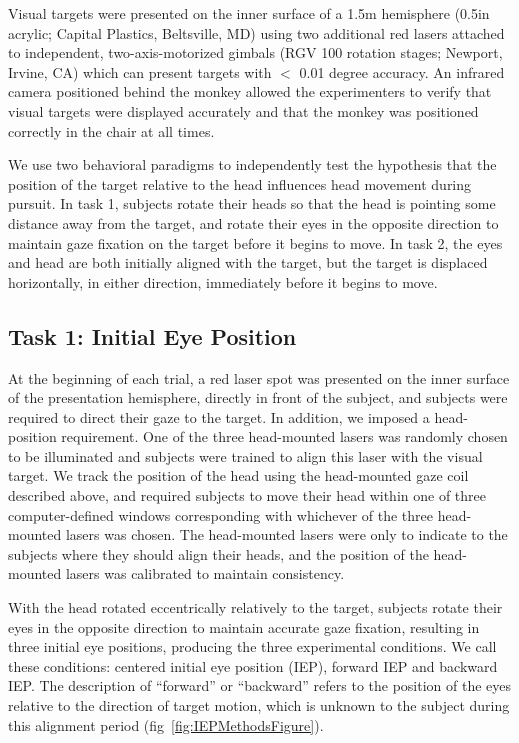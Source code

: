 \documentclass[12pt]{article}
\begin{document}
Visual targets were presented on the inner surface of a 1.5m hemisphere (0.5in acrylic; Capital Plastics, Beltsville, MD) using two additional red lasers attached to independent, two-axis-motorized gimbals (RGV 100 rotation stages; Newport, Irvine, CA) which can present targets with $<$ 0.01 degree accuracy. An infrared camera positioned behind the monkey allowed the experimenters to verify that visual targets were displayed accurately and that the monkey was positioned correctly in the chair at all times. 

We use two behavioral paradigms to independently test the hypothesis that the position of the target relative to the head influences head movement during pursuit. In task 1, subjects rotate their heads so that the head is pointing some distance away from the target, and rotate their eyes in the opposite direction to maintain gaze fixation on the target before it begins to move. In task 2, the eyes and head are both initially aligned with the target, but the target is displaced horizontally, in either direction, immediately before it begins to move.

\subsection{Task 1: Initial Eye Position} 
At the beginning of each trial, a red laser spot was presented on the inner surface of the presentation hemisphere, directly in front of the subject, and subjects were required to direct their gaze to the target. In addition, we imposed a head-position requirement. One of the three head-mounted lasers was randomly chosen to be illuminated and subjects were trained to align this laser with the visual target. We track the position of the head using the head-mounted gaze coil described above, and required subjects to move their head within one of three computer-defined windows corresponding with whichever of the three head-mounted lasers was chosen. The head-mounted lasers were only to indicate to the subjects where they should align their heads, and the position of the head-mounted lasers was calibrated to maintain consistency.

With the head rotated eccentrically relatively to the target, subjects rotate their eyes in the opposite direction to maintain accurate gaze fixation, resulting in three initial eye positions, producing the three experimental conditions. We call these conditions: centered initial eye position (IEP), forward IEP and backward IEP. The description of “forward” or “backward” refers to the position of the eyes relative to the direction of target motion, which is unknown to the subject during this alignment period (fig~\ref{fig:IEPMethodsFigure}).
\end{document}
